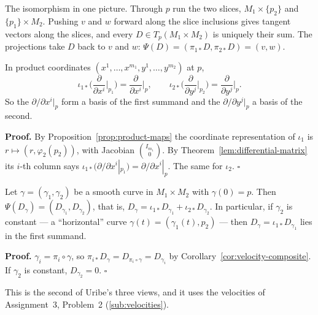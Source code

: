 \documentclass[11pt]{report}
\makeatletter
\newcounter{thmcounter}[section]
\renewenvironment{proof}[1][Proof]{\noindent\textbf{#1.} }{\hfill$\square$\par\vspace{5pt}}
\newcommand{\thmlabel}[1]{\edef\@currentlabel{\arabic{section}.\arabic{thmcounter}}\label{#1}}
\newcommand{\leeref}[1]{\par\smallskip{\raggedleft\footnotesize\textsc{Lee}:\ #1\par}}
\makeatother
\begin{document}
The isomorphism in one picture. Through $p$ run the two slices, $M_1 \times \{p_2\}$ and $\{p_1\} \times M_2$. Pushing $v$ and $w$ forward along the slice inclusions gives tangent vectors along the slices, and every $D \in T_p(M_1 \times M_2)$ is uniquely their sum. The projections take $D$ back to $v$ and $w$: $\Psi(D) = (\pi_{1*}D, \pi_{2*}D) = (v, w)$.

\begin{corbox}\thmlabel{cor:tangent-product-coords}
In product coordinates $(x^1, \ldots, x^{m_1}, y^1, \ldots, y^{m_2})$ at $p$,
\[
\iota_{1*}\Big(\frac{\partial}{\partial x^i}\Big|_{p_1}\Big) = \frac{\partial}{\partial x^i}\Big|_p, \qquad \iota_{2*}\Big(\frac{\partial}{\partial y^j}\Big|_{p_2}\Big) = \frac{\partial}{\partial y^j}\Big|_p .
\]
So the $\partial/\partial x^i|_p$ form a basis of the first summand and the $\partial/\partial y^j|_p$ a basis of the second.
\leeref{Proposition 3.14}
\end{corbox}

\begin{proof}
By Proposition~\ref{prop:product-maps} the coordinate representation of $\iota_1$ is $r \mapsto (r, \varphi_2(p_2))$, with Jacobian $\binom{I_{m_1}}{0}$. By Theorem~\ref{lem:differential-matrix} its $i$-th column says $\iota_{1*}(\partial/\partial x^i|_{p_1}) = \partial/\partial x^i|_p$. The same for $\iota_2$.
\end{proof}

\begin{corbox}\thmlabel{cor:tangent-product-curves}
Let $\gamma = (\gamma_1, \gamma_2)$ be a smooth curve in $M_1 \times M_2$ with $\gamma(0) = p$. Then $\Psi(D_\gamma) = (D_{\gamma_1}, D_{\gamma_2})$, that is, $D_\gamma = \iota_{1*}D_{\gamma_1} + \iota_{2*}D_{\gamma_2}$. In particular, if $\gamma_2$ is constant --- a ``horizontal'' curve $\gamma(t) = (\gamma_1(t), p_2)$ --- then $D_\gamma = \iota_{1*}D_{\gamma_1}$ lies in the first summand.
\end{corbox}

\begin{proof}
$\gamma_i = \pi_i \circ \gamma$, so $\pi_{i*}D_\gamma = D_{\pi_i \circ \gamma} = D_{\gamma_i}$ by Corollary~\ref{cor:velocity-composite}. If $\gamma_2$ is constant, $D_{\gamma_2} = 0$.
\end{proof}

This is the second of Uribe's three views, and it uses the velocities of Assignment~3, Problem~2 (\ref{sub:velocities}).
\end{document}
